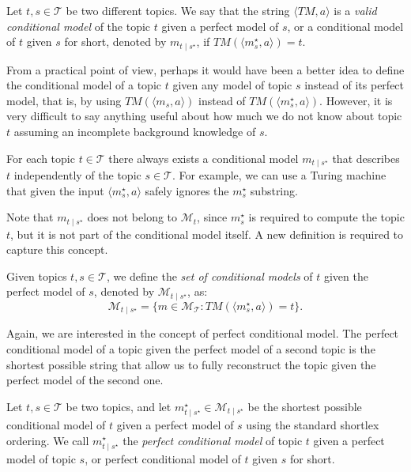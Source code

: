 \begin{definition}
Let $t,s \in \mathcal{T}$ be two different topics. We say that the string $\langle TM,a \rangle$ is a \emph{valid conditional model} of the topic $t$ given a perfect model of $s$, or a conditional model of $t$ given $s$ for short, denoted by $m_{t \mid s^\star}$, if $TM \left(\langle m_s^\star, a \rangle \right) = t$.
\end{definition}

From a practical point of view, perhaps it would have been a better idea to define the conditional model of a topic $t$ given any model of topic $s$ instead of its perfect model, that is, by using $TM \left( \langle m_s, a \rangle \right)$ instead of $TM \left( \langle m_s^\star, a \rangle \right)$. However, it is very difficult to say anything useful about how much we do not know about topic $t$ assuming an incomplete background knowledge of $s$.

\begin{example}
For each topic $t \in \mathcal{T}$ there always exists a conditional model $m_{t \mid s^\star}$ that describes $t$ independently of the topic $s \in \mathcal{T}$. For example, we can use a Turing machine that given the input $\langle m_s^\star, a \rangle$ safely ignores the $m_s^\star$ substring.
\end{example}

Note that $m_{t \mid s^\star}$ does not belong to $\mathcal{M}_t$, since $m_s^\star$ is required to compute the topic $t$, but it is not part of the conditional model itself. A new definition is required to capture this concept.

\begin{definition}
Given topics $t,s \in \mathcal{T}$, we define the \emph{set of conditional models} of $t$ given the perfect model of $s$, denoted by $\mathcal{M}_{t \mid s^\star}$, as:
\[
\mathcal{M}_{t \mid s^\star} = \{ m \in \mathcal{M}_{\mathcal{T}} : TM \left(\langle m_s^\star, a \rangle \right) = t \}.
\]
\end{definition}

Again, we are interested in the concept of perfect conditional model. The perfect conditional model of a topic given the perfect model of a second topic is the shortest possible string that allow us to fully reconstruct the topic given the perfect model of the second one.

\begin{definition}
Let $t,s \in \mathcal{T}$ be two topics, and let $m_{t \mid s^\star}^{\star} \in \mathcal{M}_{t \mid s^\star}$ be the shortest possible conditional model of $t$ given a perfect model of $s$ using the standard shortlex ordering. We call $m_{t \mid s^\star}^{\star}$ the \emph{perfect conditional model} of topic $t$ given a perfect model of topic $s$, or perfect conditional model of $t$ given $s$ for short.
\end{definition}

